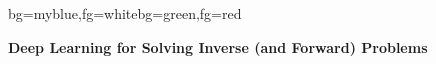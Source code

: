 {

\begin{frame}[plain]
\begin{variableblock}{}{bg=myblue,fg=white}{bg=green,fg=red}
\begin{center}
\textbf{Deep Learning for Solving Inverse (and Forward) Problems}
\end{center}
\end{variableblock}
\end{frame}
}
